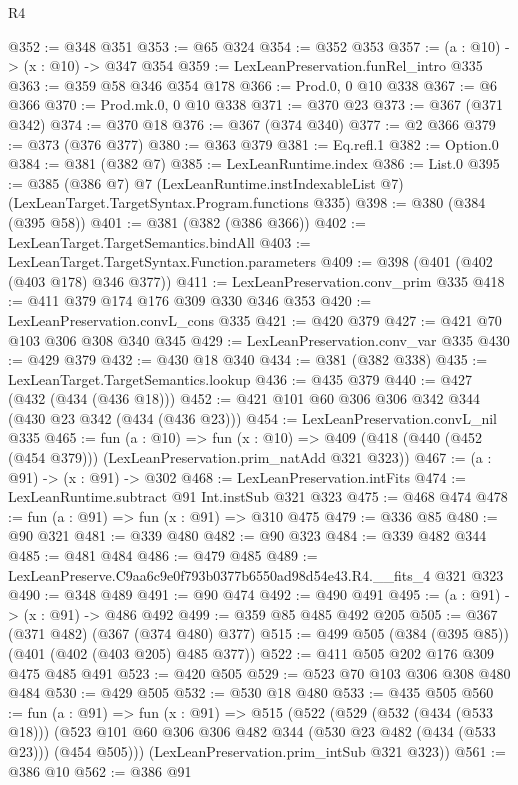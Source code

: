 \begin{lexlean}{R4}
\begin{coremodule}
@352 := @348 @351
@353 := @65 @324
@354 := @352 @353
@357 := (a : @10) -> (x : @10) -> @347 @354
@359 := LexLeanPreservation.funRel_intro @335
@363 := @359 @58 @346 @354 @178
@366 := Prod.{0, 0} @10 @338
@367 := @6 @366
@370 := Prod.mk.{0, 0} @10 @338
@371 := @370 @23
@373 := @367 (@371 @342)
@374 := @370 @18
@376 := @367 (@374 @340)
@377 := @2 @366
@379 := @373 (@376 @377)
@380 := @363 @379
@381 := Eq.refl.{1}
@382 := Option.{0}
@384 := @381 (@382 @7)
@385 := LexLeanRuntime.index
@386 := List.{0}
@395 := @385
    (@386 @7)
    @7
    (LexLeanRuntime.instIndexableList @7)
    (LexLeanTarget.TargetSyntax.Program.functions @335)
@398 := @380 (@384 (@395 @58))
@401 := @381 (@382 (@386 @366))
@402 := LexLeanTarget.TargetSemantics.bindAll
@403 := LexLeanTarget.TargetSyntax.Function.parameters
@409 := @398 (@401 (@402 (@403 @178) @346 @377))
@411 := LexLeanPreservation.conv_prim @335
@418 := @411 @379 @174 @176 @309 @330 @346 @353
@420 := LexLeanPreservation.convL_cons @335
@421 := @420 @379
@427 := @421 @70 @103 @306 @308 @340 @345
@429 := LexLeanPreservation.conv_var @335
@430 := @429 @379
@432 := @430 @18 @340
@434 := @381 (@382 @338)
@435 := LexLeanTarget.TargetSemantics.lookup
@436 := @435 @379
@440 := @427 (@432 (@434 (@436 @18)))
@452 := @421 @101 @60 @306 @306 @342 @344 (@430 @23 @342 (@434 (@436 @23)))
@454 := LexLeanPreservation.convL_nil @335
@465 := fun (a : @10) =>
  fun (x : @10) => @409 (@418 (@440 (@452 (@454 @379))) (LexLeanPreservation.prim_natAdd @321 @323))
@467 := (a : @91) -> (x : @91) -> @302
@468 := LexLeanPreservation.intFits
@474 := LexLeanRuntime.subtract @91 Int.instSub @321 @323
@475 := @468 @474
@478 := fun (a : @91) => fun (x : @91) => @310 @475
@479 := @336 @85
@480 := @90 @321
@481 := @339 @480
@482 := @90 @323
@484 := @339 @482 @344
@485 := @481 @484
@486 := @479 @485
@489 := LexLeanPreserve.C9aa6c9e0f793b0377b6550ad98d54e43.R4.__fits_4 @321 @323
@490 := @348 @489
@491 := @90 @474
@492 := @490 @491
@495 := (a : @91) -> (x : @91) -> @486 @492
@499 := @359 @85 @485 @492 @205
@505 := @367 (@371 @482) (@367 (@374 @480) @377)
@515 := @499 @505 (@384 (@395 @85)) (@401 (@402 (@403 @205) @485 @377))
@522 := @411 @505 @202 @176 @309 @475 @485 @491
@523 := @420 @505
@529 := @523 @70 @103 @306 @308 @480 @484
@530 := @429 @505
@532 := @530 @18 @480
@533 := @435 @505
@560 := fun (a : @91) =>
  fun (x : @91) =>
  @515
    (@522
      (@529
        (@532 (@434 (@533 @18)))
        (@523 @101 @60 @306 @306 @482 @344 (@530 @23 @482 (@434 (@533 @23))) (@454 @505)))
      (LexLeanPreservation.prim_intSub @321 @323))
@561 := @386 @10
@562 := @386 @91

\end{coremodule}
\end{lexlean}
